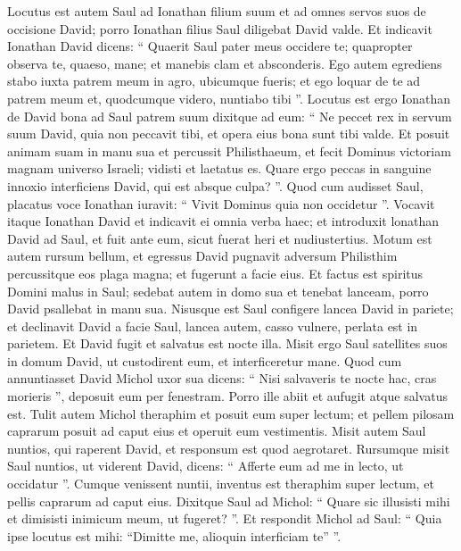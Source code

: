 \begin{biblechapter}
\begin{biblechapter}
\begin{biblechapter}
\begin{biblechapter}
\begin{biblechapter}
\begin{biblechapter}
\begin{biblechapter}
\begin{biblechapter}
\begin{biblechapter}
\begin{biblechapter}
\begin{biblechapter}
\begin{biblechapter}
\begin{biblechapter}
\begin{biblechapter}
\begin{biblechapter}
\begin{biblechapter}
\begin{biblechapter}
\begin{biblechapter}
\begin{biblechapter}
\verse Locutus est autem Saul ad Ionathan filium suum et ad omnes servos suos de occisione David; porro Ionathan filius Saul diligebat David valde. 
\verse Et indicavit Ionathan David dicens: “ Quaerit Saul pater meus occidere te; quapropter observa te, quaeso, mane; et manebis clam et absconderis. 
\verse Ego autem egrediens stabo iuxta patrem meum in agro, ubicumque fueris; et ego loquar de te ad patrem meum et, quodcumque videro, nuntiabo tibi ”. 
\verse Locutus est ergo Ionathan de David bona ad Saul patrem suum dixitque ad eum: “ Ne peccet rex in servum suum David, quia non peccavit tibi, et opera eius bona sunt tibi valde. 
\verse Et posuit animam suam in manu sua et percussit Philisthaeum, et fecit Dominus victoriam magnam universo Israeli; vidisti et laetatus es. Quare ergo peccas in sanguine innoxio interficiens David, qui est absque culpa? ”. 
 \verse Quod cum audisset Saul, placatus voce Ionathan iuravit: “ Vivit Dominus quia non occidetur ”. 
\verse Vocavit itaque Ionathan David et indicavit ei omnia verba haec; et introduxit lonathan David ad Saul, et fuit ante eum, sicut fuerat heri et nudiustertius.
 \verse Motum est autem rursum bellum, et egressus David pugnavit adversum Philisthim percussitque eos plaga magna; et fugerunt a facie eius. 
\verse Et factus est spiritus Domini malus in Saul; sedebat autem in domo sua et tenebat lanceam, porro David psallebat in manu sua. 
\verse Nisusque est Saul configere lancea David in pariete; et declinavit David a facie Saul, lancea autem, casso vulnere, perlata est in parietem. Et David fugit et salvatus est nocte illa. 
\verse Misit ergo Saul satellites suos in domum David, ut custodirent eum, et interficeretur mane.
 Quod cum annuntiasset David Michol uxor sua dicens: “ Nisi salvaveris te nocte hac, cras morieris ”, 
\verse deposuit eum per fenestram. Porro ille abiit et aufugit atque salvatus est.
 \verse Tulit autem Michol theraphim et posuit eum super lectum; et pellem pilosam caprarum posuit ad caput eius et operuit eum vestimentis. 
\verse Misit autem Saul nuntios, qui raperent David, et responsum est quod aegrotaret. 
\verse Rursumque misit Saul nuntios, ut viderent David, dicens: “ Afferte eum ad me in lecto, ut occidatur ”. 
\verse Cumque venissent nuntii, inventus est theraphim super lectum, et pellis caprarum ad caput eius. 
\verse Dixitque Saul ad Michol: “ Quare sic illusisti mihi et dimisisti inimicum meum, ut fugeret? ”. Et respondit Michol ad Saul: “ Quia ipse locutus est mihi: “Dimitte me, alioquin interficiam te” ”.

\end{biblechapter}
\end{biblechapter}
\end{biblechapter}
\end{biblechapter}
\end{biblechapter}
\end{biblechapter}
\end{biblechapter}
\end{biblechapter}
\end{biblechapter}
\end{biblechapter}
\end{biblechapter}
\end{biblechapter}
\end{biblechapter}
\end{biblechapter}
\end{biblechapter}
\end{biblechapter}
\end{biblechapter}
\end{biblechapter}
\end{biblechapter}
